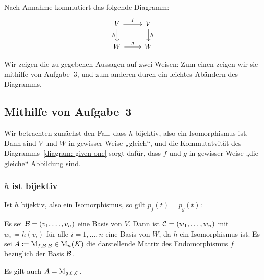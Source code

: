\section{}

Nach Annahme kommutiert das folgende Diagramm:
\begin{equation}
  \label{diagram: given one}
  \begin{tikzcd}
      V
      \arrow{r}{f}
      \arrow[swap]{d}{h}
    & V
      \arrow{d}{h}
    \\
      W
      \arrow{r}{g}
    & W
  \end{tikzcd}
\end{equation}

Wir zeigen die zu gegebenen Aussagen auf zwei Weisen:
Zum einen zeigen wir sie mithilfe von Aufgabe~3, und zum anderen durch ein leichtes Abändern des Diagramms.





\subsection*{Mithilfe von Aufgabe~3}

Wir betrachten zunächst den Fall, dass $h$ bijektiv, also ein Isomorphismus ist.
Dann sind $V$ und $W$ in gewisser Weise „gleich“, und die Kommutatvität des Diagramms~\eqref{diagram: given one} sorgt dafür, dass $f$ und $g$ in gewisser Weise „die gleiche“ Abbildung sind.


\subsubsection*{$h$ ist bijektiv}

Ist $h$ bijektiv, also ein Isomorphismus, so gilt $p_f(t) = p_g(t)$:

Es sei $\mathcal{B} = (v_1, \dotsc, v_n)$ eine Basis von $V$.
Dann ist $\mathcal{C} = (w_1, \dotsc, w_n)$ mit $w_i \coloneqq h(v_i)$ für alle $i = 1, \dotsc, n$ eine Basis von $W$, da $h$ ein Isomorphismus ist.
Es sei $A \coloneqq \operatorname{M}_{f, \mathcal{B}, \mathcal{B}} \in \operatorname{M}_{n}(K)$ die darstellende Matrix des Endomorphismus $f$ bezüglich der Basis $\mathcal{B}$.

\begin{claim}
  Es gilt auch $A = \operatorname{M}_{g, \mathcal{C}, \mathcal{C}}$.
\end{claim}


